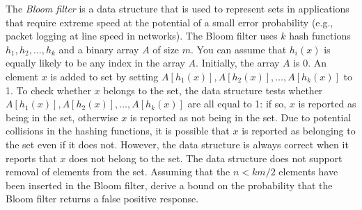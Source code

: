 \documentclass[fleqn]{homework}
\begin{document}
  \begin{problem}{2}
    \begin{question}
      The \textit{Bloom filter} is a data structure that is used to represent
      sets in applications that require extreme speed at the potential of a
      small error probability (e.g., packet logging at line speed in
      networks). The Bloom filter uses $k$ hash functions $h_1, h_2, ..., h_k$
      and a binary array $A$ of size $m$. You can assume that $h_i(x)$ is
      equally likely to be any index in the array $A$. Initially, the array $A$
      is 0. An element $x$ is added to set by setting
      $A[h_1(x)], A[h_2(x)], \dots, A[h_k(x)]$ to 1. To check whether $x$
      belongs to the set, the data structure tests whether
      $A[h_1(x)], A[h_2(x)], \dots, A[h_k(x)]$ are all equal to 1: if so, $x$ is
      reported as being in the set, otherwise $x$ is reported as not being in
      the set. Due to potential collisions in the hashing functions, it is
      possible that $x$ is reported as belonging to the set even if it does
      not. However, the data structure is always correct when it reports that
      $x$ does not belong to the set. The data structure does not support
      removal of elements from the set. Assuming that the $n<km/2$ elements have
      been inserted in the Bloom filter, derive a bound on the probability that
      the Bloom filter returns a false positive response.
    \end{question}
  \end{problem}
\end{document}
